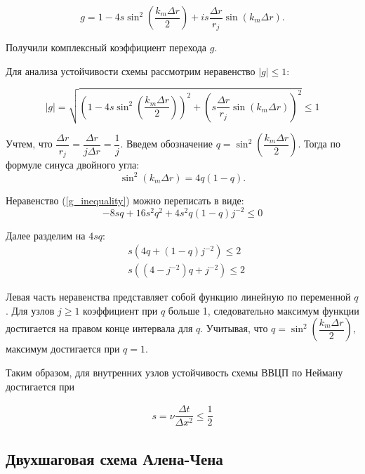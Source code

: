 \begin{equation} \label{g_final}
	g = 1 - 4s\sin^2 \left( \dfrac{k_m\Delta r}{2} \right) + is\dfrac{\Delta r}{r_j}\sin (k_m\Delta r) .
\end{equation}

Получили комплексный коэффициент перехода $g$.

Для анализа устойчивости схемы рассмотрим неравенство $|g| \le 1$:

\begin{equation} \label{g_inequality}
	|g| = \sqrt{
	\left( 1 - 4s \sin^2 \left( \dfrac{k_m\Delta r}{2} \right) \right)^2 + \left( s \frac{\Delta r}{r_j} \sin (k_m \Delta r)\right)^2
	} \le 1
\end{equation}

Учтем, что $\dfrac{\Delta r}{r_j} = \dfrac{\Delta r}{j\Delta r} = \dfrac{1}{j}$. Введем обозначение $q = \sin^2 \left( \dfrac{k_m \Delta r}{2} \right)$. Тогда по формуле синуса двойного угла:
\begin{equation*}
	\sin^2 (k_m \Delta r) = 4q(1-q).
\end{equation*}

Неравенство (\ref{g_inequality}) можно переписать в виде:
\begin{equation}
	- 8sq + 16s^2q^2 + 4 s^2 q(1-q)j^{-2} \le 0 
\end{equation}

Далее разделим на $4sq$:
\begin{equation}
\begin{split}
	&s\left( 4q + (1-q) j^{-2} \right) \le 2 \\
	&s\left( \left( 4 - j^{-2} \right)q + j^{-2} \right) \le 2
\end{split}
\end{equation}

Левая часть неравенства представляет собой функцию линейную по переменной $q$. Для узлов $j \ge 1$ коэффициент при $q$ больше 1, следовательно максимум функции достигается на правом конце интервала для $q$. Учитывая, что $q = \sin^2 \left( \dfrac{k_m \Delta r}{2} \right)$, максимум достигается при $q=1$.

Таким образом, для внутренних узлов устойчивость схемы ВВЦП по Нейману достигается при 

\begin{align} \label{ftcs_CFL}
	 s = \nu \dfrac{\Delta t}{\Delta x^2} \le \dfrac{1}{2}
\end{align}

\subsection{Двухшаговая схема Алена-Чена}

